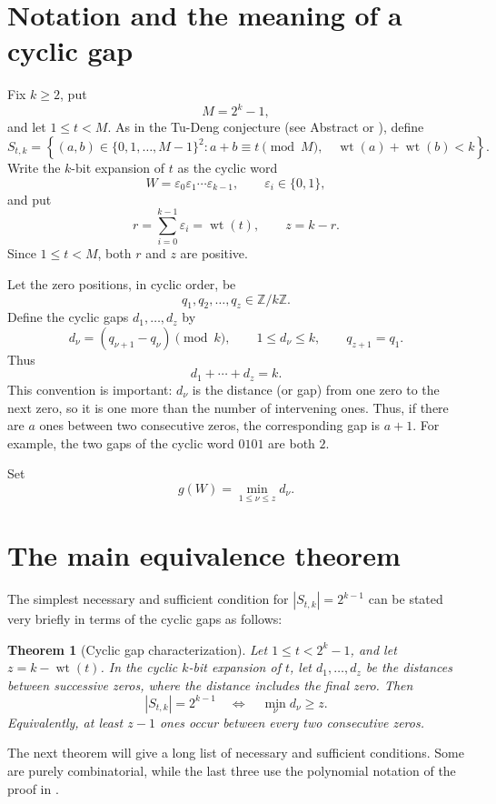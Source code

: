 \documentclass[10pt,a4paper]{article}
\newtheorem{theorem}{Theorem}[section]
\newcommand{\wt}{\operatorname{wt}}
\begin{document}
\section{Notation and the meaning of a cyclic gap}

Fix $k\geq2$, put
\[
                         M=2^k-1,
\]
and let $1\leq t<M$.  As in the Tu-Deng conjecture (see Abstract or \cite[Conjecture 1.1]{Proof}), define
\[
S_{t,k}=\left\{(a,b)\in\{0,1,\ldots,M-1\}^2:
 a+b\equiv t\pmod M,\quad \wt(a)+\wt(b)<k\right\}.
\]
Write the $k$-bit expansion of $t$ as the cyclic word
\[
 W=\varepsilon _0\varepsilon _1\cdots\varepsilon _{k-1},
 \qquad \varepsilon_i\in\{0,1\},
\]
and put
\[
 r=\sum_{i=0}^{k-1}\varepsilon_i=\wt(t),
 \qquad z=k-r.
\]
Since $1\leq t<M$, both $r$ and $z$ are positive.

Let the zero positions, in cyclic order, be
\[
q_1,q_2,\ldots,q_z\in\mathbb Z/k\mathbb Z.
\]
Define the cyclic gaps $d_1,\ldots,d_z$ by
\[
 d_\nu=(q_{\nu+1}-q_\nu)\pmod k,
 \qquad 1\leq d_\nu\leq k,
 \qquad q_{z+1}=q_1.
\]
Thus
\[
                         d_1+\cdots+d_z=k.                 \tag{1}
\]
This convention is important: $d_\nu$ is the distance (or gap) from one zero to
the next zero, so it is one more than the number of intervening ones.
Thus, if there are $a$ ones between two consecutive zeros, the
corresponding gap is $a+1$.  For example, the two gaps
of the cyclic word $0101$ are both $2$.

Set
\[
                         g(W)=\min_{1\leq\nu\leq z}d_\nu.  \tag{2}
\]

\section{The main equivalence theorem}
The simplest necessary and sufficient condition for $|S_{t,k}|=2^{k-1}$  can be stated 
very briefly in terms of the cyclic gaps as follows:

\begin{theorem}[Cyclic gap characterization]
Let $1\leq t<2^k-1$, and let $z=k-\wt(t)$.  In the cyclic $k$-bit
expansion of $t$, let $d_1,\ldots,d_z$ be the distances between
successive zeros, where the distance includes the final zero.
Then
\[
                         |S_{t,k}|=2^{k-1}
 \quad\Longleftrightarrow\quad
                         \min_\nu d_\nu\geq z.               
\]
Equivalently, at least $z-1$ ones occur between every two consecutive
zeros.
\end{theorem}


The next theorem will give a long list of necessary and sufficient conditions.  Some are purely
combinatorial, while the last three use the polynomial notation of the proof in
\cite[Sections 2--5 and 8]{Proof}.
\end{document}
